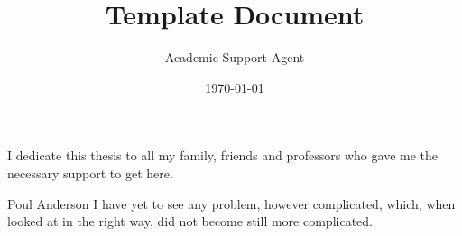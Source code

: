 \documentclass{article}
\title{Template Document}
\author{Academic Support Agent}
\date{\today}
\begin{document}
\maketitle

\frontpage

\presentationpage

\begin{fichacatalografica}
	\FakeFichaCatalografica %
\end{fichacatalografica}

\banca

\begin{dedicatory}
I dedicate this thesis to all my family, friends and professors who gave me the
necessary support to get here.
\end{dedicatory}

\acknowledgements


\begin{epigraph}[]{Poul Anderson}
I have yet to see any problem, however complicated, which, when looked at in the
right way, did not become still more complicated.
\end{epigraph}

\resumo


\abstract






\listofacronyms












\begin{references}
  
\end{references}


\theappendix
\end{document}
